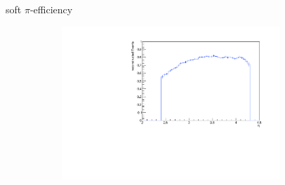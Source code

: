 \documentclass[11pt]{beamer}
\begin{document}
\begin{frame}{soft $\pi$-efficiency}
\begin{figure}
\begin{subfigure}{0.45\textwidth}
\end{subfigure}
\begin{subfigure}{0.45\textwidth}
\includegraphics[width=0.9\textwidth]{up_pdf/single/neg/h_eta_reco_SPi_neg.pdf}
\end{subfigure}
\end{figure}
\end{frame}
\end{document}
